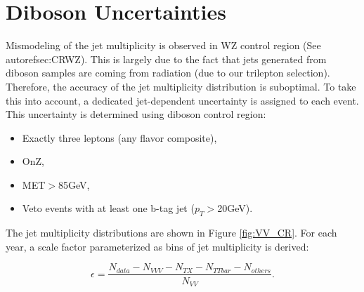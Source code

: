 \section{Diboson Uncertainties}
\label{sec:DiUnc}

Mismodeling of the jet multiplicity is observed in WZ control region (See autoref{sec:CRWZ}). This is largely due to the fact that jets generated from diboson samples are coming from radiation (due to our trilepton selection). Therefore, the accuracy of the jet multiplicity distribution is suboptimal. To take this into account, a dedicated jet-dependent uncertainty is assigned to each event. This uncertainty is determined using diboson control region:

\begin{itemize}
\item Exactly three leptons (any flavor composite),
\item OnZ,
\item MET$>$85GeV,
\item Veto events with at least one b-tag jet ($p_T>$20GeV).
\end{itemize}

The jet multiplicity distributions are shown in Figure \ref{fig:VV_CR}. For each year, a scale factor parameterized as bins of jet multiplicity is derived:

\begin{equation}
\epsilon=\frac{N_{data}-N_{VVV}-N_{TX}-N_{TTbar}-N_{others}}{N_{VV}}.
\end{equation}

